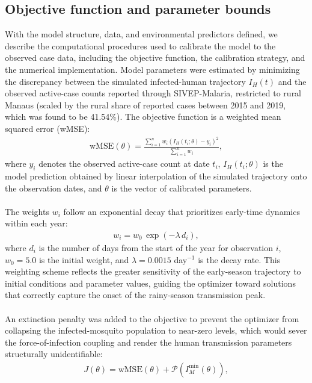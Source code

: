 \documentclass[a4paper,fleqn]{cas-dc}
\begin{document}
\subsection{Objective function and parameter bounds}
\label{sec:objective_function}

With the model structure, data, and environmental predictors defined, we describe the computational procedures used to calibrate the model to the observed case data, including the objective function, the calibration strategy, and the numerical implementation.
Model parameters were estimated by minimizing the discrepancy between the simulated infected-human trajectory $I_H(t)$ and the observed active-case counts reported through SIVEP-Malaria, restricted to rural Manaus (scaled by the rural share of reported cases between 2015 and 2019, which was found to be 41.54$\%$). The objective function is a weighted mean squared error (wMSE):
\begin{align}
\text{wMSE}(\theta) = \frac{\sum_{i=1}^{n} w_i \left( I_H(t_i;\theta) - y_i \right)^2}{\sum_{i=1}^{n} w_i},
\label{eq:wmse}
\end{align}
where $y_i$ denotes the observed active-case count at date $t_i$, $I_H(t_i;\theta)$ is the model prediction obtained by linear interpolation of the simulated trajectory onto the observation dates, and $\theta$ is the vector of calibrated parameters.
\\\\
The weights $w_i$ follow an exponential decay that prioritizes early-time dynamics within each year:
\begin{align}
w_i = w_0 \, \exp\!\left(-\lambda \, d_i\right),
\label{eq:weight}
\end{align}
where $d_i$ is the number of days from the start of the year for observation $i$, $w_0 = 5.0$ is the initial weight, and $\lambda = 0.0015$ \textrm{day}$^{-1}$ is the decay rate. This weighting scheme reflects the greater sensitivity of the early-season trajectory to initial conditions and parameter values, guiding the optimizer toward solutions that correctly capture the onset of the rainy-season transmission peak.
\\\\
An extinction penalty was added to the objective to prevent the optimizer from collapsing the infected-mosquito population to near-zero levels, which would sever the force-of-infection coupling and render the human transmission parameters structurally unidentifiable:
\begin{align}
J(\theta) = \text{wMSE}(\theta) + \mathcal{P}\!\left(I_M^{\min}(\theta)\right),
\label{eq:combined}
\end{align}
\end{document}
